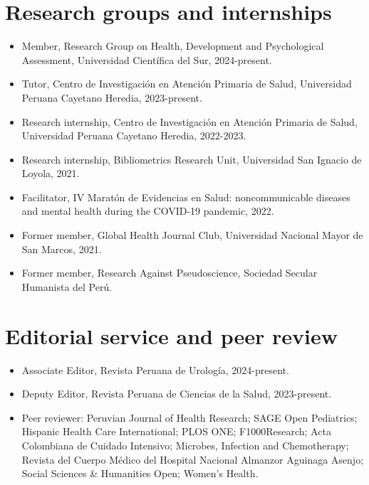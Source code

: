 \documentclass[11pt,a4paper]{article}
\begin{document}
\section*{Research groups and internships}
\begin{itemize}[leftmargin=*,itemsep=4pt]
\item Member, Research Group on Health, Development and Psychological Assessment, Universidad Científica del Sur, 2024-present.
\item Tutor, Centro de Investigación en Atención Primaria de Salud, Universidad Peruana Cayetano Heredia, 2023-present.
\item Research internship, Centro de Investigación en Atención Primaria de Salud, Universidad Peruana Cayetano Heredia, 2022-2023.
\item Research internship, Bibliometrics Research Unit, Universidad San Ignacio de Loyola, 2021.
\item Facilitator, IV Maratón de Evidencias en Salud: noncommunicable diseases and mental health during the COVID-19 pandemic, 2022.
\item Former member, Global Health Journal Club, Universidad Nacional Mayor de San Marcos, 2021.
\item Former member, Research Against Pseudoscience, Sociedad Secular Humanista del Perú.
\end{itemize}
\section*{Editorial service and peer review}
\begin{itemize}[leftmargin=*,itemsep=4pt]
\item Associate Editor, Revista Peruana de Urología, 2024-present.
\item Deputy Editor, Revista Peruana de Ciencias de la Salud, 2023-present.
\item Peer reviewer: Peruvian Journal of Health Research; SAGE Open Pediatrics; Hispanic Health Care International; PLOS ONE; F1000Research; Acta Colombiana de Cuidado Intensivo; Microbes, Infection and Chemotherapy; Revista del Cuerpo Médico del Hospital Nacional Almanzor Aguinaga Asenjo; Social Sciences \& Humanities Open; Women's Health.
\end{itemize}
\end{document}
